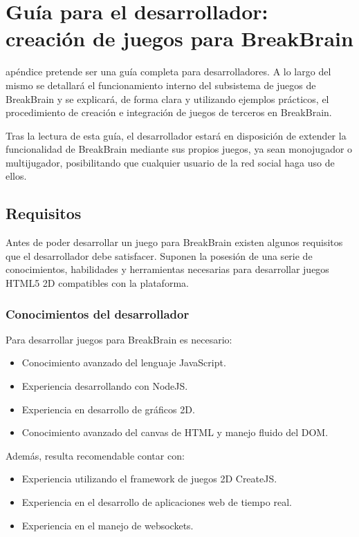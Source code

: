\chapter{Guía para el desarrollador: creación de juegos para BreakBrain}
\label{chap::guia}

 apéndice pretende ser una guía completa para desarrolladores. A lo largo del mismo se detallará el funcionamiento interno del subsistema de juegos de BreakBrain y se explicará, de forma clara y utilizando ejemplos prácticos, el procedimiento de creación e integración de juegos de terceros en BreakBrain.

Tras la lectura de esta guía, el desarrollador estará en disposición de extender la funcionalidad de BreakBrain mediante sus propios juegos, ya sean monojugador o multijugador, posibilitando que cualquier usuario de la red social haga uso de ellos.

\section{Requisitos}

Antes de poder desarrollar un juego para BreakBrain existen algunos requisitos que el desarrollador debe satisfacer. Suponen la posesión de una serie de conocimientos, habilidades y herramientas necesarias para desarrollar juegos HTML5 2D compatibles con la plataforma.

\subsection{Conocimientos del desarrollador}

Para desarrollar juegos para BreakBrain es necesario:

\begin{itemize}
\item Conocimiento avanzado del lenguaje JavaScript.
\item Experiencia desarrollando con NodeJS.
\item Experiencia en desarrollo de gráficos 2D.
\item Conocimiento avanzado del canvas de \acs{HTML} y manejo fluido del \acs{DOM}.
\end{itemize}

Además, resulta recomendable contar con:

\begin{itemize}
\item Experiencia utilizando el framework de juegos 2D CreateJS.
\item Experiencia en el desarrollo de aplicaciones web de tiempo real.
\item Experiencia en el manejo de websockets.
\end{itemize}

